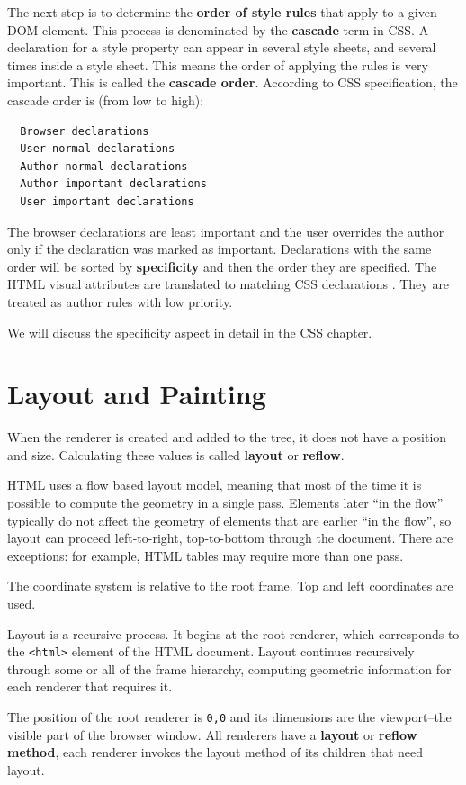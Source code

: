 \documentclass[a4paper, justified, notoc]{tufte-handout} %
\begin{document}
The next step is to determine the \textbf{order of style rules} that apply to a given DOM element. This process is denominated by the \textbf{cascade} term in CSS.  
A declaration for a style property can appear in several style sheets, and several times inside a style sheet. This means the order of applying the rules is very important. This is called the \textbf{cascade order}. According to CSS specification, the cascade order is (from low to high):
\begin{Verbatim}
  Browser declarations
  User normal declarations
  Author normal declarations
  Author important declarations
  User important declarations
\end{Verbatim}
The browser declarations are least important and the user overrides the author only if the declaration was marked as important. Declarations with the same order will be sorted by \textbf{specificity} and then the order they are specified. The HTML visual attributes are translated to matching CSS declarations . They are treated as author rules with low priority.

We will discuss the specificity aspect in detail in the CSS chapter.


\section{Layout and Painting} %
\label{sec:layout}

When the renderer is created and added to the tree, it does not have a position and size. Calculating these values is called \textbf{layout} or \textbf{reflow}.

HTML uses a flow based layout model, meaning that most of the time it is possible to compute the geometry in a single pass. Elements later ``in the flow'' typically do not affect the geometry of elements that are earlier ``in the flow'', so layout can proceed left-to-right, top-to-bottom through the document. There are exceptions: for example, HTML tables may require more than one pass.

The coordinate system is relative to the root frame. Top and left coordinates are used.

Layout is a recursive process. It begins at the root renderer, which corresponds to the \texttt{<html>} element of the HTML document. Layout continues recursively through some or all of the frame hierarchy, computing geometric information for each renderer that requires it.

The position of the root renderer is \texttt{0,0} and its dimensions are the viewport–the visible part of the browser window.
All renderers have a \textbf{layout} or \textbf{reflow method}, each renderer invokes the layout method of its children that need layout.
\end{document}
